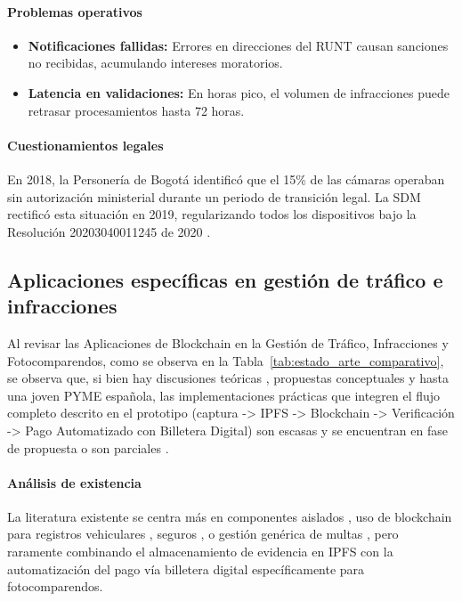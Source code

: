 \paragraph{Problemas operativos}
\begin{itemize}
    \item \textbf{Notificaciones fallidas: }Errores en direcciones del RUNT causan sanciones no recibidas, acumulando intereses moratorios. 
    \item \textbf{Latencia en validaciones:  }En horas pico, el volumen de infracciones puede retrasar procesamientos hasta 72 horas.
\end{itemize}

\paragraph{Cuestionamientos legales}
En 2018, la Personería de Bogotá identificó que el 15\% de las cámaras operaban sin autorización ministerial durante un periodo de transición legal. La SDM rectificó esta situación en 2019, regularizando todos los dispositivos bajo la Resolución 20203040011245 de 2020 \parencite{secretaria_movilidad2023}. 

\subsection{Aplicaciones específicas en gestión de tráfico e infracciones} 

Al revisar las Aplicaciones de Blockchain en la Gestión de Tráfico, Infracciones y Fotocomparendos, como se observa en la Tabla~\ref{tab:estado_arte_comparativo}, se observa que, si bien hay discusiones teóricas \parencite{yousfi2022its}, propuestas conceptuales \parencite{chen2024blockchain} y hasta una joven PYME española, las implementaciones prácticas que integren el flujo completo descrito en el prototipo (captura -> IPFS -> Blockchain -> Verificación -> Pago Automatizado con Billetera Digital) son escasas y se encuentran en fase de propuesta o son parciales \parencite{omar2024srtm,choquevilca2024blockchain}.

 

\paragraph{Análisis de existencia}
La literatura existente se centra más en componentes aislados \parencite{yousfi2022its}, uso de blockchain para registros vehiculares \parencite{mani2023smart}, seguros \parencite{dutta2023solution}, o gestión genérica de multas \parencite{omar2024srtm}, pero raramente combinando el almacenamiento de evidencia en IPFS con la automatización del pago vía billetera digital específicamente para fotocomparendos.

